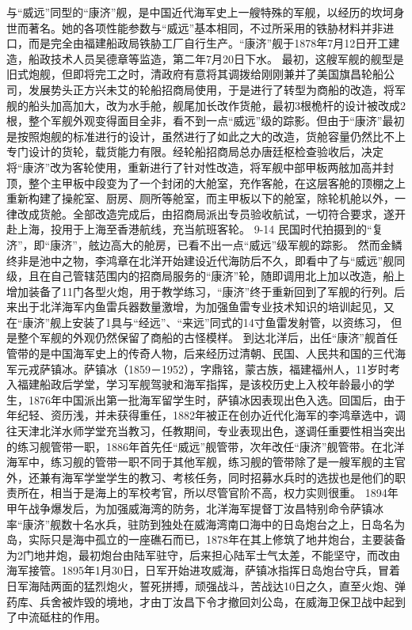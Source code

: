 \documentclass[12pt,UTF8]{ctexbook}
\begin{document}
与“威远”同型的“康济”舰，是中国近代海军史上一艘特殊的军舰，以经历的坎坷身世而著名。她的各项性能参数与“威远”基本相同，不过所采用的铁胁材料并非进口，而是完全由福建船政局铁胁工厂自行生产。“康济”舰于1878年7月12日开工建造，船政技术人员吴德章等监造，第二年7月20日下水。 最初，这艘军舰的舰型是旧式炮舰，但即将完工之时，清政府有意将其调拨给刚刚兼并了美国旗昌轮船公司，发展势头正方兴未艾的轮船招商局使用，于是进行了转型为商船的改造，将军舰的船头加高加大，改为水手舱，舰尾加长改作货舱，最初3根桅杆的设计被改成2根，整个军舰外观变得面目全非，看不到一点“威远”级的踪影。但由于“康济”最初是按照炮舰的标准进行的设计，虽然进行了如此之大的改造，货舱容量仍然比不上专门设计的货轮，载货能力有限。经轮船招商局总办唐廷枢检查验收后，决定将“康济”改为客轮使用，重新进行了针对性改造，将军舰中部甲板两舷加高并封顶，整个主甲板中段变为了一个封闭的大舱室，充作客舱，在这层客舱的顶棚之上重新构建了操舵室、厨房、厕所等舱室，而主甲板以下的舱室，除轮机舱以外，一律改成货舱。全部改造完成后，由招商局派出专员验收航试，一切符合要求，遂开赴上海，投用于上海至香港航线，充当航班客轮。
9-14
民国时代拍摄到的“复济”，即“康济”，舷边高大的舱房，已看不出一点“威远”级军舰的踪影。
然而金鳞终非是池中之物，李鸿章在北洋开始建设近代海防后不久，即看中了与“威远”舰同级，且在自己管辖范围内的招商局服务的“康济”轮，随即调用北上加以改造，船上增加装备了11门各型火炮，用于教学练习，“康济”终于重新回到了军舰的行列。后来出于北洋海军内鱼雷兵器数量激增，为加强鱼雷专业技术知识的培训起见，又在“康济”舰上安装了1具与“经远”、“来远”同式的14寸鱼雷发射管，以资练习， 但是整个军舰的外观仍然保留了商船的古怪模样。
到达北洋后，出任“康济”舰首任管带的是中国海军史上的传奇人物，后来经历过清朝、民国、人民共和国的三代海军元戎萨镇冰。萨镇冰（1859－1952），字鼎铭，蒙古族，福建福州人，11岁时考入福建船政后学堂，学习军舰驾驶和海军指挥，是该校历史上入校年龄最小的学生，1876年中国派出第一批海军留学生时，萨镇冰因表现出色入选。回国后，由于年纪轻、资历浅，并未获得重任，1882年被正在创办近代化海军的李鸿章选中，调往天津北洋水师学堂充当教习，任教期间，专业表现出色，遂调任重要性相当突出的练习舰管带一职，1886年首先任“威远”舰管带，次年改任“康济”舰管带。在北洋海军中，练习舰的管带一职不同于其他军舰，练习舰的管带除了是一艘军舰的主官外，还兼有海军学堂学生的教习、考核任务，同时招募水兵时的选拔也是他们的职责所在，相当于是海上的军校考官，所以尽管官阶不高，权力实则很重。
1894年甲午战争爆发后，为加强威海湾的防务，北洋海军提督丁汝昌特别命令萨镇冰率“康济”舰数十名水兵，驻防到独处在威海湾南口海中的日岛炮台之上，日岛名为岛，实际只是海中孤立的一座礁石而已，1878年在其上修筑了地井炮台，主要装备为2门地井炮，最初炮台由陆军驻守，后来担心陆军士气太差，不能坚守，而改由海军接管。1895年1月30日，日军开始进攻威海，萨镇冰指挥日岛炮台守兵，冒着日军海陆两面的猛烈炮火，誓死拼搏，顽强战斗，苦战达10日之久，直至火炮、弹药库、兵舍被炸毁的境地，才由丁汝昌下令才撤回刘公岛，在威海卫保卫战中起到了中流砥柱的作用。
\end{document}
